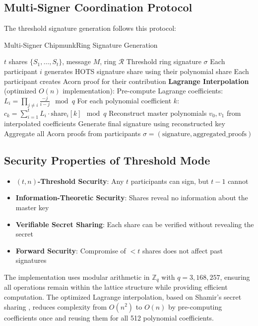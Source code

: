 \documentclass[11pt,a4paper]{article}
\begin{document}
\subsection{Multi-Signer Coordination Protocol}

The threshold signature generation follows this protocol:

\begin{algorithm}
\caption{Multi-Signer ChipmunkRing Signature Generation}
\begin{algorithmic}[1]
\REQUIRE $t$ shares $\{S_1, \ldots, S_t\}$, message $M$, ring $\mathcal{R}$
\ENSURE Threshold ring signature $\sigma$
\STATE Each participant $i$ generates HOTS signature share using their polynomial share
\STATE Each participant creates Acorn proof for their contribution
\STATE \textbf{Lagrange Interpolation} (optimized $O(n)$ implementation):
\STATE \quad Pre-compute Lagrange coefficients: $L_i = \prod_{j \neq i} \frac{-j}{i-j} \mod q$
\STATE \quad For each polynomial coefficient $k$:
\STATE \quad \quad $c_k = \sum_{i=1}^t L_i \cdot \text{share}_i[k] \mod q$
\STATE Reconstruct master polynomials $v_0, v_1$ from interpolated coefficients
\STATE Generate final signature using reconstructed key
\STATE Aggregate all Acorn proofs from participants
\RETURN $\sigma = (\text{signature}, \text{aggregated\_proofs})$
\end{algorithmic}
\end{algorithm}

\subsection{Security Properties of Threshold Mode}

\begin{itemize}
\item \textbf{$(t,n)$-Threshold Security}: Any $t$ participants can sign, but $t-1$ cannot
\item \textbf{Information-Theoretic Security}: Shares reveal no information about the master key
\item \textbf{Verifiable Secret Sharing}: Each share can be verified without revealing the secret
\item \textbf{Forward Security}: Compromise of $< t$ shares does not affect past signatures
\end{itemize}

The implementation uses modular arithmetic in $\mathbb{Z}_q$ with $q = 3,168,257$, ensuring all operations remain within the lattice structure while providing efficient computation. The optimized Lagrange interpolation, based on Shamir's secret sharing \cite{shamir1979}, reduces complexity from $O(n^2)$ to $O(n)$ by pre-computing coefficients once and reusing them for all 512 polynomial coefficients.
\end{document}
